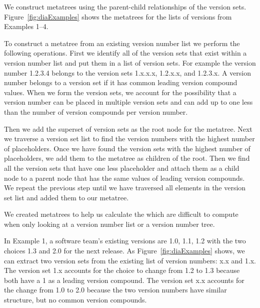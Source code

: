 \documentclass[conference]{IEEEtran}
\begin{document}
We construct metatrees using the parent-child relationships of the version sets.
Figure~\ref{fig:diaExamples} shows the metatrees for the lists of versions from Examples 1--4. 

To construct a metatree from an existing version number list we perform the following operations.
First we identify all of the version sets that exist within a version number list and put them in a list of version sets.
For example the version number 1.2.3.4 belongs to the version sets 1.x.x.x, 1.2.x.x, and 1.2.3.x. 
A version number belongs to a version set if it has common leading version compound values.
When we form the version sets, we account for the possibility that a version number can be placed in multiple version sets and can add up to one less than the number of version compounds per version number.

Then we add the superset of version sets as the root node for the metatree.
Next we traverse a version set list to find the version numbers with the highest number of placeholders.
Once we have found the version sets with the highest number of placeholders, we add them to the metatree as children of the root.
Then we find all the version sets that have one less placeholder and attach them as a child node to a parent node that has the same values of leading version compounds.
We repeat the previous step until we have traversed all elements in the version set list and added them to our metatree.


We  created metatrees to help us calculate the \numberchoices which are difficult to compute when only looking at a version number list or a version number tree.

In Example 1, a software team's existing versions are 1.0, 1.1, 1.2 with the two choices 1.3 and 2.0 for the next release. As Figure~\ref{fig:diaExamples} shows, we can extract two version sets from the existing list of version numbers: x.x and 1.x. The version set 1.x accounts for the choice to change from 1.2 to 1.3 because both have a 1 as a leading version compound. The version set x.x accounts for the change from 1.0 to 2.0 because the two version numbers have similar structure, but no common version compounds.

\end{document}
